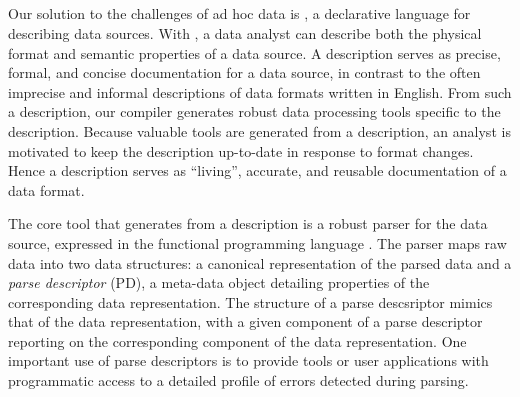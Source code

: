 
\subsection{\padsmlbig{}}

Our solution to the challenges of ad hoc data is \padsml{}, a
declarative language for describing data sources.  With \padsml{}, a
data analyst can describe both the physical format and semantic
properties of a data source.  A \padsml{} description serves as
precise, formal, and concise documentation for a data source, in
contrast to the often imprecise and informal descriptions of data
formats written in English.  From such a \padsml{} description, our
compiler generates robust data processing tools specific to the
description.  Because valuable tools are generated from a description,
an analyst is motivated to keep the description up-to-date in response
to format changes.  Hence a description serves as ``living'',
accurate, and reusable documentation of a data format.

The core tool that \padsml{} generates from a description is a robust
parser for the data source, expressed in the functional programming
language \ocaml{}.  The parser maps raw data into two data structures:
a canonical representation of the parsed data and a \textit{parse
descriptor} (PD), a meta-data object detailing properties of the
corresponding data representation.  The structure of a parse
descsriptor mimics that of the data representation, with a given
component of a parse descriptor reporting on the corresponding
component of the data representation.  One important use of parse
descriptors is to provide \padsml{} tools or user applications with
programmatic access to a detailed profile of errors detected during
parsing.


